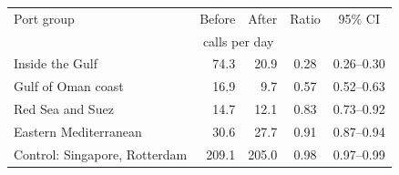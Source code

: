\begin{tabular}{@{}lrrcc@{}}\toprule
Port group & Before & After & Ratio & 95\% CI\\
 & \multicolumn{2}{c}{calls per day} & & \\\midrule
Inside the Gulf & 74.3 & 20.9 & 0.28 & 0.26--0.30\\
Gulf of Oman coast & 16.9 & 9.7 & 0.57 & 0.52--0.63\\
Red Sea and Suez & 14.7 & 12.1 & 0.83 & 0.73--0.92\\
Eastern Mediterranean & 30.6 & 27.7 & 0.91 & 0.87--0.94\\
Control: Singapore, Rotterdam & 209.1 & 205.0 & 0.98 & 0.97--0.99\\
\bottomrule\end{tabular}